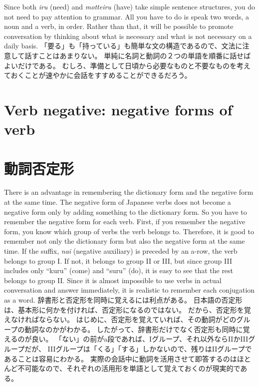 \documentclass[uplatex,dvipdfmx,b5paper,english,10pt]{jsbook}
\begin{document}
\begin{toianswer}
\ifEnglish
Since both {\it iru\/} (need) and {\it motteiru\/} (have) take simple sentence structures, you do not need to pay attention to grammar.
All you have to do is speak two words, a noun and a verb, in order.
Rather than that, it will be possible to promote conversation by thinking about what is necessary and what is not necessary on a daily basis.
\else
「要る」も「持っている」も簡単な文の構造であるので、文法に注意して話すことはあまりない。
単純に名詞と動詞の２つの単語を順番に話せばよいだけである。
むしろ、準備として日頃から必要なものと不要なものを考えておくことが速やかに会話をすすめることができるだろう。
\fi
\end{toianswer}

%


\ifEnglish
\section{Verb negative: negative forms of verb}
\else
\section{動詞否定形}
\fi

\ifEnglish
There is an advantage in remembering the dictionary form and the negative form at the same time.
The negative form of Japanese verbs does not become a negative form only by adding something to the dictionary form.
So you have to remember the negative form for each verb.
First, if you remember the negative form, you know which group of verbs the verb belongs to.
Therefore, it is good to remember not only the dictionary form but also the negative form at the same time.
If the suffix, {\it nai} (negative auxiliary) is preceded by an a-row, the verb belongs to group I.
If not, it belongs to group II or III, but since group III includes only ``kuru'' (come) and ``suru'' (do), it is easy to see that the rest belongs to group II.
Since it is almost impossible to use verbs in actual conversation and answer immediately, it is realistic to remember each conjugation as a word.
\else
辞書形と否定形を同時に覚えるには利点がある。
日本語の否定形は、基本形に何かを付ければ、否定形になるのではない。
だから、否定形を覚えなければならない。
はじめに、否定形を覚えていれば、その動詞がどのグループの動詞なのかがわかる。
したがって、辞書形だけでなく否定形も同時に覚えるのが良い。
「ない」の前がa段であれば、Iグループ、それ以外ならIIかIIIグループだが、
IIIグループは「くる」「する」しかないので、残りはIIグループであることは容易にわかる。
実際の会話中に動詞を活用させて即答するのはほとんど不可能なので、それぞれの活用形を単語として覚えておくのが現実的である。
\fi
\end{document}
